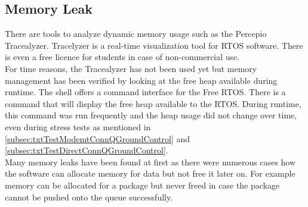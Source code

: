 \subsection{Memory Leak}
There are tools to analyze dynamic memory usage such as the Percepio Tracealyzer. Tracelyzer is a real-time visualization tool for RTOS software. There is even a free licence for students in case of non-commercial use.\\
For time reasons, the Tracealyzer has not been used yet but memory management has been verified by looking at the free heap available during runtime. The shell offers a command interface for the Free RTOS. There is a command that will display the free heap available to the RTOS. During runtime, this command was run frequently and the heap usage did not change over time, even during stress tests as mentioned in \autoref{subsec:txtTestModemtConnQGroundControl} and \autoref{subsec:txtTestDirectConnQGroundControl}.\\
Many memory leaks have been found at first as there were numerous cases how the software can allocate memory for data but not free it later on. For example memory can be allocated for a package but never freed in case the package cannot be pushed onto the queue successfully.
%
%
%
%
%
%
%
%
%
